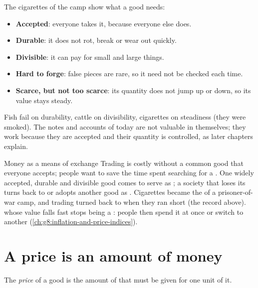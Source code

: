 The cigarettes of the camp show what a good  needs:
\begin{itemize}
  \item \textbf{Accepted}: everyone takes it, because everyone else does.
  \item \textbf{Durable}: it does not rot, break or wear out quickly.
  \item \textbf{Divisible}: it can pay for small and large things.
  \item \textbf{Hard to forge}: false pieces are rare, so it need not be checked each time.
  \item \textbf{Scarce, but not too scarce}: its quantity does not jump up or down, so its
        value stays steady.
\end{itemize}
Fish fail on durability, cattle on divisibility, cigarettes on steadiness (they were
smoked). The notes and accounts of today are not valuable in themselves; they work because
they are accepted and their quantity is controlled, as later chapters explain.

\begin{model}{Money as a means of exchange}
\assumes Trading is costly without a common good that everyone accepts; people want to
save the time spent searching for a .
\predicts One widely accepted, durable and divisible good comes to serve as ; a
society that loses its  turns back to  or adopts another good as .
\tested Cigarettes became the  of a prisoner-of-war camp, and trading turned back to
 when they ran short (the record above).
\breaks {} whose value falls fast stops being a : people then spend it at
once or switch to another  (\cref{ch:g8:inflation-and-price-indices}).
\end{model}

\section{A price is an amount of money}

\begin{definition}[Price]\label{def:g7:money:price}
The \emph{price} of a good is the amount of  that must be given for one
unit of it.
\end{definition}

